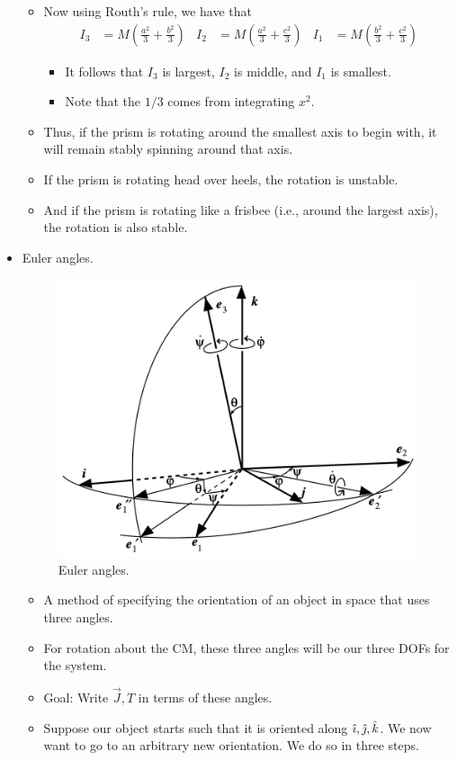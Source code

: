 \documentclass[../notes.tex]{subfiles}
\begin{document}
\begin{itemize}
\begin{itemize}
        \item Now using Routh's rule, we have that
        \begin{align*}
            I_3 &= M\left( \frac{a^2}{3}+\frac{b^2}{3} \right)&
            I_2 &= M\left( \frac{a^2}{3}+\frac{c^2}{3} \right)&
            I_1 &= M\left( \frac{b^2}{3}+\frac{c^2}{3} \right)
        \end{align*}
        \begin{itemize}
            \item It follows that $I_3$ is largest, $I_2$ is middle, and $I_1$ is smallest.
            \item Note that the $1/3$ comes from integrating $x^2$.
        \end{itemize}
        \item Thus, if the prism is rotating around the smallest axis to begin with, it will remain stably spinning around that axis.
        \item If the prism is rotating head over heels, the rotation is unstable.
        \item And if the prism is rotating like a frisbee (i.e., around the largest axis), the rotation is also stable.
    \end{itemize}
    \item Euler angles.
    \begin{figure}[h!]
        \centering
        \includegraphics[width=0.47\linewidth]{../ExtFiles/EulerAngles.png}
        \caption{Euler angles.}
        \label{fig:EulerAngles}
    \end{figure}
    \begin{itemize}
        \item A method of specifying the orientation of an object in space that uses three angles.
        \item For rotation about the CM, these three angles will be our three DOFs for the system.
        \item Goal: Write $\vec{J},T$ in terms of these angles.
        \item Suppose our object starts such that it is oriented along $\hat{\imath},\hat{\jmath},\hat{k}$. We now want to go to an arbitrary new orientation. We do so in three steps.

\end{itemize}
\end{itemize}
\end{document}
